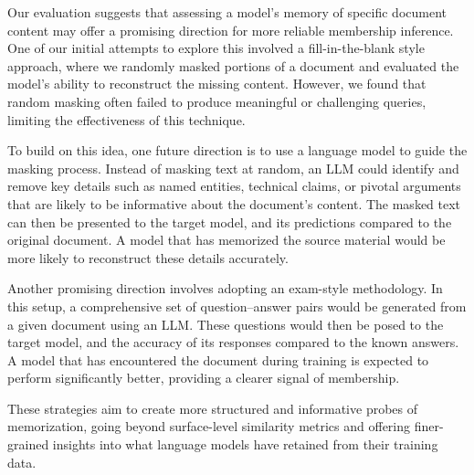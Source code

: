 \documentclass[sigconf]{acmart}
\begin{document}
Our evaluation suggests that assessing a model’s memory of specific document content may offer a promising direction for more reliable membership inference. One of our initial attempts to explore this involved a fill-in-the-blank style approach, where we randomly masked portions of a document and evaluated the model’s ability to reconstruct the missing content. However, we found that random masking often failed to produce meaningful or challenging queries, limiting the effectiveness of this technique.

To build on this idea, one future direction is to use a language model to guide the masking process. Instead of masking text at random, an LLM could identify and remove key details such as named entities, technical claims, or pivotal arguments that are likely to be informative about the document’s content. The masked text can then be presented to the target model, and its predictions compared to the original document. A model that has memorized the source material would be more likely to reconstruct these details accurately.

Another promising direction involves adopting an exam-style methodology. In this setup, a comprehensive set of question–answer pairs would be generated from a given document using an LLM. These questions would then be posed to the target model, and the accuracy of its responses compared to the known answers. A model that has encountered the document during training is expected to perform significantly better, providing a clearer signal of membership.

These strategies aim to create more structured and informative probes of memorization, going beyond surface-level similarity metrics and offering finer-grained insights into what language models have retained from their training data.



\end{document}
